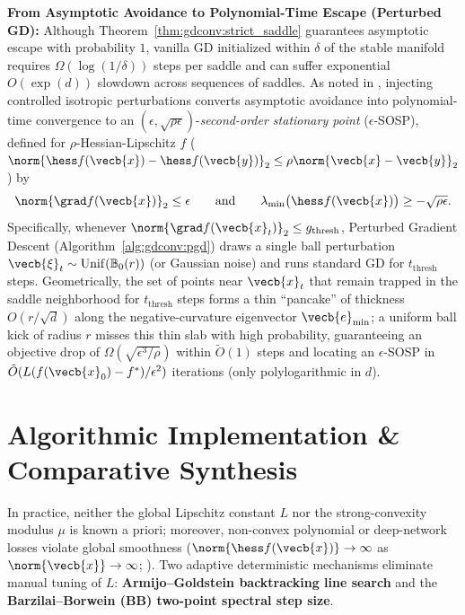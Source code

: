 \documentclass[../../../../master.tex]{subfiles}
\begin{document}
\textbf{From Asymptotic Avoidance to Polynomial-Time Escape (Perturbed GD):} Although Theorem~\ref{thm:gdconv:strict_saddle} guarantees asymptotic escape with probability $1$, vanilla GD initialized within $\delta$ of the stable manifold requires $\Omega(\log(1/\delta))$ steps per saddle and can suffer exponential $O(\exp(d))$ slowdown across sequences of saddles. As noted in , injecting controlled isotropic perturbations converts asymptotic avoidance into polynomial-time convergence to an $(\epsilon, \sqrt{\rho\epsilon})$-\emph{second-order stationary point} ($\epsilon$-SOSP), defined for $\rho$-Hessian-Lipschitz $f$ ($\norm{\hess f(\vecb{x}) - \hess f(\vecb{y})}_2 \le \rho\norm{\vecb{x}-\vecb{y}}_2$) by
\begin{equation}
\label{eq:gdconv:sosp}
  \norm{\grad f(\vecb{x})}_2 \le \epsilon \qquad \text{and} \qquad \lambda_{\min}\big(\hess f(\vecb{x})\big) \ge -\sqrt{\rho\epsilon}.
\end{equation}
Specifically, whenever $\norm{\grad f(\vecb{x}_t)}_2 \le g_{\mathrm{thresh}}$, Perturbed Gradient Descent (Algorithm~\ref{alg:gdconv:pgd}) draws a single ball perturbation $\vecb{\xi}_t \sim \mathrm{Unif}(\mathbb{B}_0(r))$ (or Gaussian noise) and runs standard GD for $t_{\mathrm{thresh}}$ steps. Geometrically, the set of points near $\vecb{x}_t$ that remain trapped in the saddle neighborhood for $t_{\mathrm{thresh}}$ steps forms a thin ``pancake'' of thickness $O(r / \sqrt{d})$ along the negative-curvature eigenvector $\vecb{e}_{\min}$; a uniform ball kick of radius $r$ misses this thin slab with high probability, guaranteeing an objective drop of $\Omega(\sqrt{\epsilon^3/\rho})$ within $\tilde{O}(1)$ steps and locating an $\epsilon$-SOSP in $\tilde{O}(L(f(\vecb{x}_0)-f^*)/\epsilon^2)$ iterations (only polylogarithmic in $d$).

\section{Algorithmic Implementation \& Comparative Synthesis}
\label{sec:gdconv:algorithms}

In practice, neither the global Lipschitz constant $L$ nor the strong-convexity modulus $\mu$ is known a priori; moreover, non-convex polynomial or deep-network losses violate global smoothness ($\norm{\hess f(\vecb{x})} \to \infty$ as $\norm{\vecb{x}} \to \infty$; ). Two adaptive deterministic mechanisms eliminate manual tuning of $L$: \textbf{Armijo--Goldstein backtracking line search}   and the \textbf{Barzilai--Borwein (BB) two-point spectral step size}.
\end{document}
